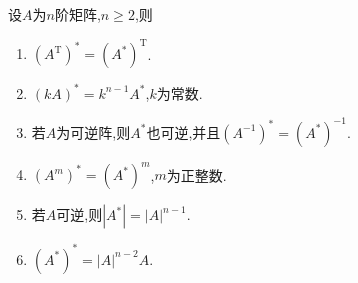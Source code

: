 \documentclass[../../main.tex]{subfiles}
\begin{document}
\begin{proposition}[伴随矩阵的性质]\label{proposition:伴随矩阵的性质}
设\(A\)为\(n\)阶矩阵,\(n\geqslant  2\),则
\begin{enumerate}
\item\label{伴随矩阵的性质1}  \((A^{\mathrm{T}})^* = (A^*)^{\mathrm{T}}\).

\item  \((kA)^* = k^{n - 1}A^*\),\(k\)为常数.

\item\label{伴随矩阵的性质3}  若$A$为可逆阵,则$A^*$也可逆,并且\((A^{-1})^* = (A^*)^{-1}\).

\item  \((A^{m})^* = (A^*)^{m}\),\(m\)为正整数.

\item\label{伴随矩阵的性质5} 若$A$可逆,则\(|A^*| = |A|^{n - 1}\).

\item  \((A^*)^* = |A|^{n - 2}A\).
\end{enumerate}
\end{proposition}
\end{document}
